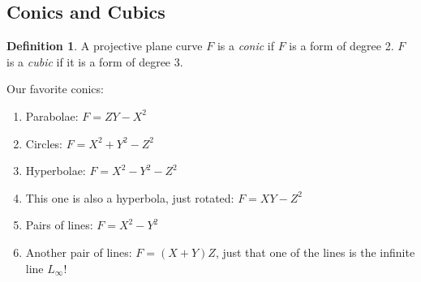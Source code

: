 \documentclass[12pt]{article}
\newcommand{\ita}[1]{\textit{#1}}
\theoremstyle{definition}
\newtheorem{definition}[theorem]{Definition}
\begin{document}
\subsection{Conics and Cubics}
\begin{definition}
    A projective plane curve $F$ is a \ita{conic} if $F$ is a form of degree 2. $F$ is a \ita{cubic} if it is a form of degree 3.
\end{definition}
Our favorite conics:
\begin{enumerate}
    \item Parabolae: $F=ZY-X^2$
    \item Circles: $F=X^2+Y^2-Z^2$
    \item Hyperbolae: $F=X^2-Y^2-Z^2$
    \item This one is also a hyperbola, just rotated: $F=XY-Z^2$
    \item Pairs of lines: $F=X^2-Y^2$
    \item Another pair of lines: $F=(X+Y)Z$, just that one of the lines is the infinite line $L_{\infty}$!
\end{enumerate}
\end{document}
